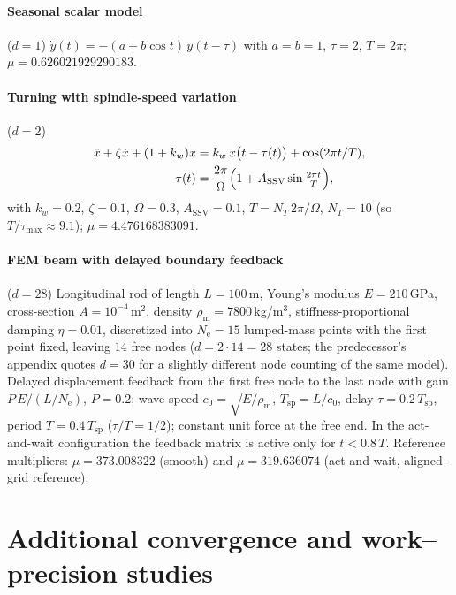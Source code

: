 \documentclass[Afour,sageh,times]{sagej}
\begin{document}
\paragraph{Seasonal scalar model} ($d=1$)
$\dot{y}(t) = -(a + b\cos t)\, y(t - \tau)$ with $a = b = 1$, $\tau = 2$,
$T = 2\pi$; $\mu = 0.626021929290183$.

\paragraph{Turning with spindle-speed variation} ($d=2$)
\begin{align*}
  \ddot{x} + \zeta \dot{x} + (1 + k_w)x
  &= k_w\, x\bigl(t - \tau(t)\bigr) + \cos(2\pi t/T),\\
  \tau(t) &= \frac{2\pi}{\Omega}\Bigl(1 + A_\mathrm{SSV}
    \sin\tfrac{2\pi t}{T}\Bigr),
\end{align*}
with $k_w = 0.2$, $\zeta = 0.1$, $\Omega = 0.3$, $A_\mathrm{SSV} = 0.1$,
$T = N_T\, 2\pi/\Omega$, $N_T = 10$ (so $T/\tau_{\max} \approx 9.1$);
$\mu = 4.476168383091$.

\paragraph{FEM beam with delayed boundary feedback} ($d = 28$)
Longitudinal rod of length $L = 100$\,m, Young's modulus $E = 210$\,GPa,
cross-section $A = 10^{-4}$\,m$^2$, density
$\rho_\mathrm{m} = 7800$\,kg/m$^3$, stiffness-proportional damping
$\eta = 0.01$, discretized into $N_\mathrm{e} = 15$ lumped-mass points with
the first point fixed, leaving $14$ free nodes ($d = 2\cdot14 = 28$ states;
the predecessor's appendix quotes $d = 30$ for a slightly different node
counting of the same model).
Delayed displacement feedback from the first free node to the last node with
gain $P\,E/(L/N_\mathrm{e})$, $P = 0.2$; wave speed
$c_0 = \sqrt{E/\rho_\mathrm{m}}$,
$T_\mathrm{sp} = L/c_0$, delay $\tau = 0.2\,T_\mathrm{sp}$, period
$T = 0.4\,T_\mathrm{sp}$ ($\tau/T = 1/2$); constant unit force at the free
end. In the act-and-wait configuration the feedback matrix is active only for
$t < 0.8\,T$. Reference multipliers: $\mu = 373.008322$ (smooth) and
$\mu = 319.636074$ (act-and-wait, aligned-grid reference).

\section{Additional convergence and work--precision studies}
\label{app:morewp}
\end{document}
